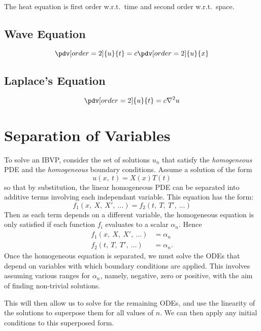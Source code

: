 \documentclass{article}
\begin{document}
The heat equation is first order w.r.t.\ time and second order w.r.t.\ space.
\subsection{Wave Equation}
\begin{equation*}
    \pdv[order=2]{u}{t} = c\pdv[order=2]{u}{x}
\end{equation*}
\subsection{Laplace's Equation}
\begin{equation*}
    \pdv[order=2]{u}{t} = c \nabla^2 u
\end{equation*}
\section{Separation of Variables}
To solve an IBVP, consider the set of solutions \(u_n\) that satisfy the \textit{homogeneous}
PDE and the \textit{homogeneous} boundary conditions. Assume a solution of the form
\begin{equation*}
    u\left( x,\: t \right) = X\left( x \right) T\left( t \right)
\end{equation*}
so that by substitution, the linear homogeneous PDE can be separated into additive terms involving each independant variable.
This equation has the form:
\begin{equation*}
    f_1\left( x,\: X,\: X',\: \dots \right) = f_2\left( t,\: T,\: T',\: \dots \right)
\end{equation*}
Then as each term depends on a different variable, the homogeneous equation is only satisfied if each function \(f_i\) evaluates to a scalar \(\alpha_n\).
Hence
\begin{align*}
    f_1\left( x,\: X,\: X',\: \dots \right) & = \alpha_n  \\
    f_2\left( t,\: T,\: T',\: \dots \right) & = \alpha_n.
\end{align*}
Once the homogeneous equation is separated, we must solve the ODEs that depend on variables with which boundary conditions are
applied. This involves assuming various ranges for \(\alpha_n\), namely, negative, zero or positive, with the aim of
finding non-trivial solutions.

This will then allow us to solve for the remaining ODEs, and use the linearity of the solutions to superpose them for all values of \(n\).
We can then apply any initial conditions to this superposed form.
\end{document}
